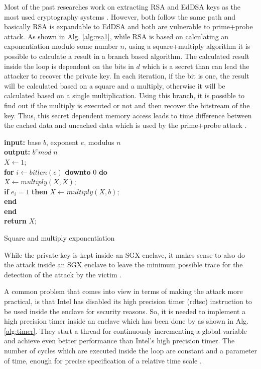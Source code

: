 Most of the past researches work on extracting RSA and EdDSA keys as the most used cryptography systems \cite{mge,leakycauldron,brasser2017software, pigeonhole,cloak,stealthy}. However, both follow the same path and basically RSA is expandable to EdDSA and both are vulnerable to prime+probe attack. As shown in Alg. \ref{alg:rsa1}, while RSA is based on calculating an exponentiation modulo some number $n$, using a square+multiply algorithm it is possible to calculate a result in a branch based algorithm. The calculated result inside the loop is dependent on the bits in $d$ which is a secret than can lead the attacker to recover the private key. In each iteration, if the bit is one, the result will be calculated based on a square and a multiply, otherwise it will be calculated based on a single multiplication. Using this branch, it is possible to find out if the multiply is executed or not and then recover the bitstream of the key. Thus, this secret dependent memory access leads to time difference between the cached data and uncached data which is used by the prime+probe attack \cite{mge,cloak}.

\begin{algorithm}[t]
	\textbf{input:} base $b$, exponent $e$, modulus $n$\\
	\textbf{output:} $b^e mod \; n$\\
	$X \leftarrow 1;$\\
	\textbf{for} $i \leftarrow bitlen(e)$ \textbf{downto} $0$ \textbf{do}\\
	\tab $X \leftarrow multiply(X, X);$\\
	\tab \textbf{if} $e_i=1$ \textbf{then}
	\tab \tab $X \leftarrow multiply(X, b);$\\
	\tab \textbf{end}\\
	\textbf{end}\\
	\textbf{return} $X;$
	
	\caption{Square and multiply exponentiation \cite{mge}}
	\label{alg:rsa1}
\end{algorithm}

While the private key is kept inside an SGX enclave, it makes sense to also do the attack inside an SGX enclave to leave the minimum possible trace for the detection of the attack by the victim \cite{mge}.

A common problem that comes into view in terms of making the attack more practical, is that Intel has disabled its high precision timer (rdtsc) instruction to be used inside the enclave for security reasons. So, it is needed to implement a high precision timer inside an enclave which has been done by \cite{mge} as shown in Alg. \ref{alg:timer}. They start a thread for continuously incrementing a global variable and achieve even better performance than Intel's high precision timer. The number of cycles which are executed inside the loop are constant and a parameter of time, enough for precise specification of a relative time scale \cite{mge}.

